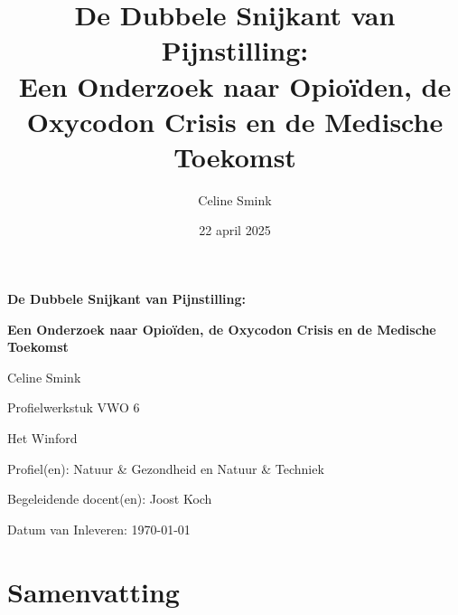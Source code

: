 \documentclass[11pt, a4paper]{report} %
\title{De Dubbele Snijkant van Pijnstilling: \\ Een Onderzoek naar Opioïden, de Oxycodon Crisis en de Medische Toekomst}
\author{Celine Smink} %
\date{22 april 2025} %
\begin{document}
\begin{titlepage}
    \centering
    \vspace*{2cm} %

    {\Huge\bfseries De Dubbele Snijkant van Pijnstilling: \par}
    \vspace{0.5cm}
    {\Large\bfseries Een Onderzoek naar Opioïden, de Oxycodon Crisis en de Medische Toekomst\par}
    \vspace{2.5cm}

    {\Large Celine Smink \par} %
    \vspace{1.5cm}

    {\large Profielwerkstuk VWO 6 \par}
    \vspace{0.5cm}
    {\large Het Winford \par} %
    \vspace{0.5cm}
    {\large Profiel(en): Natuur \& Gezondheid en Natuur \& Techniek \par} %
    \vspace{1.5cm}

    {\large Begeleidende docent(en): Joost Koch \par} %
    \vspace{1.5cm}

    {\large Datum van Inleveren: \today \par} %

    \vfill %
\end{titlepage}

\chapter*{Samenvatting}
\setcounter{page}{1} %
\end{document}
